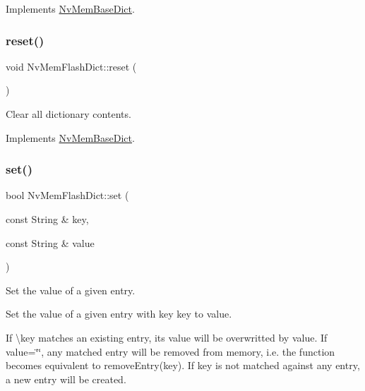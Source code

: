 Implements \mbox{\hyperlink{class_nv_mem_base_dict_a11d82ceaa4bb8b003080a1640ba40446}{Nv\+Mem\+Base\+Dict}}.

\mbox{\label{class_nv_mem_flash_dict_a77ef71d649eb918d527f17e2d10aa622}} 
\subsubsection{\texorpdfstring{reset()}{reset()}}
{\footnotesize\ttfamily void Nv\+Mem\+Flash\+Dict\+::reset (\begin{DoxyParamCaption}{ }\end{DoxyParamCaption})\hspace{0.3cm}{\ttfamily [virtual]}}



Clear all dictionary contents. 



Implements \mbox{\hyperlink{class_nv_mem_base_dict_a1ae6a2c04b8adb81fc68e0abfd01c011}{Nv\+Mem\+Base\+Dict}}.

\mbox{\label{class_nv_mem_flash_dict_ad88e325c0a9cebef246815c6bcdc9cef}} 
\subsubsection{\texorpdfstring{set()}{set()}}
{\footnotesize\ttfamily bool Nv\+Mem\+Flash\+Dict\+::set (\begin{DoxyParamCaption}\item[{const String \&}]{key,  }\item[{const String \&}]{value }\end{DoxyParamCaption})\hspace{0.3cm}{\ttfamily [virtual]}}



Set the value of a given entry. 

Set the value of a given entry with key {\ttfamily key} to {\ttfamily value}.

If \textbackslash{}key matches an existing entry, its value will be overwritted by {\ttfamily value}. If {\ttfamily value=\char`\"{}\char`\"{}}, any matched entry will be removed from memory, i.\+e. the function becomes equivalent to remove\+Entry(key). If {\ttfamily key} is not matched against any entry, a new entry will be created.

